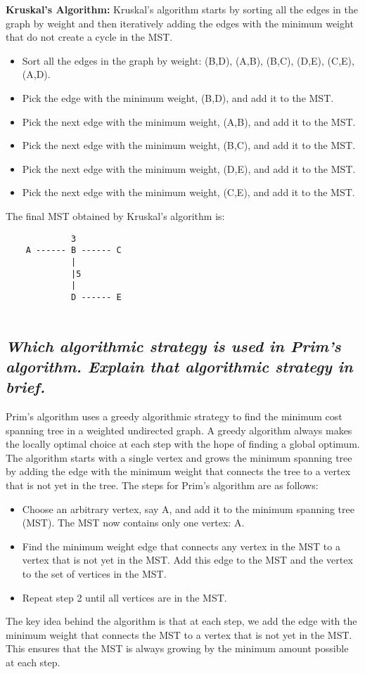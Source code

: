 \documentclass{article}
\begin{document}
\textbf{Kruskal's Algorithm:} Kruskal's algorithm starts by sorting all the edges in the graph by weight and then iteratively adding the edges with the minimum weight that do not create a cycle in the MST.
\begin{itemize}
	\item Sort all the edges in the graph by weight: (B,D), (A,B), (B,C), (D,E), (C,E), (A,D).
	\item Pick the edge with the minimum weight, (B,D), and add it to the MST.
	\item Pick the next edge with the minimum weight, (A,B), and add it to the MST.
	\item Pick the next edge with the minimum weight, (B,C), and add it to the MST.
	\item Pick the next edge with the minimum weight, (D,E), and add it to the MST.
	\item Pick the next edge with the minimum weight, (C,E), and add it to the MST.
\end{itemize}
The final MST obtained by Kruskal's algorithm is:
\begin{lstlisting}
			 3
	A ------ B ------ C
			 |      
			 |5     
			 |     
			 D ------ E
 
\end{lstlisting}
\subsection{\textit{Which algorithmic strategy is used in Prim’s algorithm. Explain that algorithmic
strategy in brief.}}
Prim's algorithm uses a greedy algorithmic strategy to find the minimum cost spanning tree in a weighted undirected graph. A greedy algorithm always makes the locally optimal choice at each step with the hope of finding a global optimum.\\

The algorithm starts with a single vertex and grows the minimum spanning tree by adding the edge with the minimum weight that connects the tree to a vertex that is not yet in the tree. The steps for Prim's algorithm are as follows:
\begin{itemize}
	\item Choose an arbitrary vertex, say A, and add it to the minimum spanning tree (MST). The MST now contains only one vertex: {A}.
	\item Find the minimum weight edge that connects any vertex in the MST to a vertex that is not yet in the MST. Add this edge to the MST and the vertex to the set of vertices in the MST.
	\item Repeat step 2 until all vertices are in the MST.
\end{itemize}
The key idea behind the algorithm is that at each step, we add the edge with the minimum weight that connects the MST to a vertex that is not yet in the MST. This ensures that the MST is always growing by the minimum amount possible at each step.\\
\end{document}
